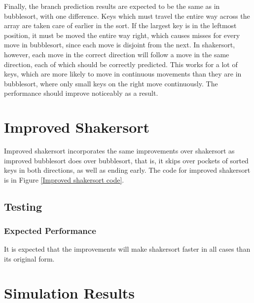 Finally, the branch prediction results are expected to be the same as in
bubblesort, with one difference. Keys which must travel the entire way across
the array are taken care of earlier in the sort. If the largest key is in the
leftmost position, it must be moved the entire way right, which causes misses
for every move in bubblesort, since each move is disjoint from the next. In
shakersort, however, each move in the correct direction will follow a move in
the same direction, each of which should be correctly predicted. This works for
a lot of keys, which are more likely to move in continuous movements than they
are in bubblesort, where only small keys on the right move continuously. The
performance should improve noticeably as a result.

\section{Improved Shakersort}
Improved shakersort incorporates the same improvements over shakersort as
improved bubblesort does over bubblesort, that is, it skips over pockets of
sorted keys in both directions, as well as ending early. The code for improved
shakersort is in Figure \vref{Improved shakersort code}.

\subsection{Testing}
\subsubsection{Expected Performance}
It is expected that the improvements will make shakersort faster in all cases
than its original form.

\section{Simulation Results}

